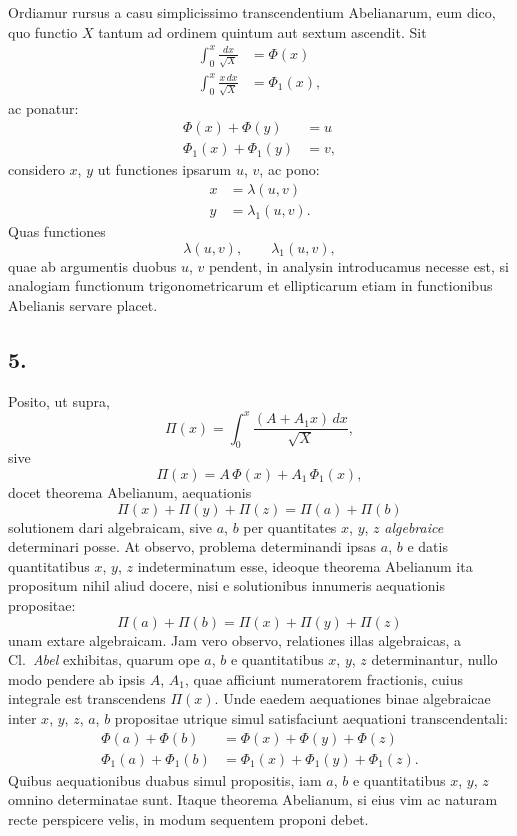 \documentclass{article}
\begin{document}
Ordiamur rursus a casu simplicissimo transcendentium Abelianarum, eum dico, quo functio $X$ tantum ad ordinem quintum aut sextum ascendit. Sit
\[ \begin{aligned} \int_0^{x} \frac{dx}{\sqrt{X}} &= \Phi(x) \\ \int_0^{x} \frac{x\,dx}{\sqrt{X}} &= \Phi_1(x), \end{aligned} \]
ac ponatur:
\[ \begin{aligned} \Phi(x) + \Phi(y) &= u \\ \Phi_1(x) + \Phi_1(y) &= v, \end{aligned} \]
considero $x$, $y$ ut functiones ipsarum $u$, $v$, ac pono:
\[ \begin{aligned} x &= \lambda(u,v) \\ y &= \lambda_1(u,v). \end{aligned} \]
Quas functiones
\[ \lambda(u,v), \qquad \lambda_1(u,v), \]
quae ab argumentis duobus $u$, $v$ pendent, in analysin introducamus necesse est, si analogiam functionum trigonometricarum et ellipticarum etiam in functionibus Abelianis servare placet.

\subsection*{5.}

Posito, ut supra,
\[ \Pi(x) = \int_0^{x} \frac{(A + A_1 x)\,dx}{\sqrt{X}}, \]
sive
\[ \Pi(x) = A\,\Phi(x) + A_1\,\Phi_1(x), \]
docet theorema Abelianum, aequationis
\[ \Pi(x) + \Pi(y) + \Pi(z) = \Pi(a) + \Pi(b) \]
solutionem dari algebraicam, sive $a$, $b$ per quantitates $x$, $y$, $z$ \emph{algebraice} determinari posse. At observo, problema determinandi ipsas $a$, $b$ e datis quantitatibus $x$, $y$, $z$ indeterminatum esse, ideoque theorema Abelianum ita propositum nihil aliud docere, nisi e solutionibus innumeris aequationis propositae:
\[ \Pi(a) + \Pi(b) = \Pi(x) + \Pi(y) + \Pi(z) \]
unam extare algebraicam. Jam vero observo, relationes illas algebraicas, a Cl.\ \emph{Abel} exhibitas, quarum ope $a$, $b$ e quantitatibus $x$, $y$, $z$ determinantur, nullo modo pendere ab ipsis $A$, $A_1$, quae afficiunt numeratorem fractionis, cuius integrale est transcendens $\Pi(x)$. Unde eaedem aequationes binae algebraicae inter $x$, $y$, $z$, $a$, $b$ propositae utrique simul satisfaciunt aequationi transcendentali:
\[ \begin{aligned} \Phi(a) + \Phi(b) &= \Phi(x) + \Phi(y) + \Phi(z) \\ \Phi_1(a) + \Phi_1(b) &= \Phi_1(x) + \Phi_1(y) + \Phi_1(z). \end{aligned} \]
Quibus aequationibus duabus simul propositis, iam $a$, $b$ e quantitatibus $x$, $y$, $z$ omnino determinatae sunt. Itaque theorema Abelianum, si eius vim ac naturam recte perspicere velis, in modum sequentem proponi debet.
\end{document}
